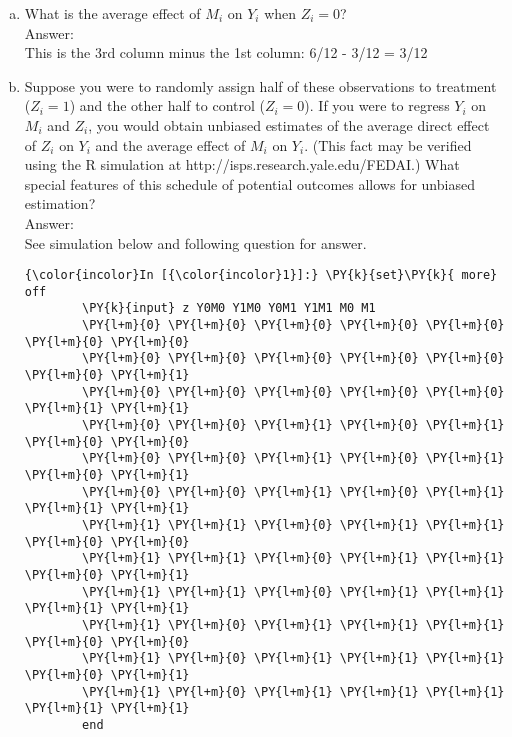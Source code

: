 \documentclass[11pt,notitlepage]{article}\usepackage[]{graphicx}\usepackage[]{color}
\makeatletter
\newenvironment{kframe}{%
 \def\at@end@of@kframe{}%
 \ifinner\ifhmode%
  \def\at@end@of@kframe{\end{minipage}}%
  \begin{minipage}{\columnwidth}%
 \fi\fi%
 \def\FrameCommand##1{\hskip\@totalleftmargin \hskip-\fboxsep
 \colorbox{shadecolor}{##1}\hskip-\fboxsep
     \hskip-\linewidth \hskip-\@totalleftmargin \hskip\columnwidth}%
 \MakeFramed {\advance\hsize-\width
   \@totalleftmargin\z@ \linewidth\hsize
   \@setminipage}}%
 {\par\unskip\endMakeFramed%
 \at@end@of@kframe}
\newenvironment{knitrout}{}{} %
\makeatother
\begin{document}
\begin{enumerate}[a)]
\item What is the average effect of $M_i$ on $Y_i$ when $Z_i = 0$?\\
Answer:\\
This is the 3rd column minus the 1st column: 6/12 - 3/12 = 3/12

\item Suppose you were to randomly assign half of these observations to treatment ($Z_i = 1$) and the other half to control ($Z_i = 0$). If you were to regress $Y_i$ on $M_i$ and $Z_i$, you would obtain unbiased estimates of the average direct effect of $Z_i$ on $Y_i$ and the average effect of $M_i$ on $Y_i$. (This fact may be verified using the R simulation at http://isps.research.yale.edu/FEDAI.) What special features of this schedule of potential outcomes allows for unbiased estimation?\\
Answer:\\
See simulation below and following question for answer.
\begin{knitrout}
\color{fgcolor}\begin{kframe}
    \begin{Verbatim}[commandchars=\\\{\}]
{\color{incolor}In [{\color{incolor}1}]:} \PY{k}{set}\PY{k}{ more} off
        \PY{k}{input} z Y0M0 Y1M0 Y0M1 Y1M1 M0 M1
        \PY{l+m}{0} \PY{l+m}{0} \PY{l+m}{0} \PY{l+m}{0} \PY{l+m}{0} \PY{l+m}{0} \PY{l+m}{0} 
        \PY{l+m}{0} \PY{l+m}{0} \PY{l+m}{0} \PY{l+m}{0} \PY{l+m}{0} \PY{l+m}{0} \PY{l+m}{1}
        \PY{l+m}{0} \PY{l+m}{0} \PY{l+m}{0} \PY{l+m}{0} \PY{l+m}{0} \PY{l+m}{1} \PY{l+m}{1}
        \PY{l+m}{0} \PY{l+m}{0} \PY{l+m}{1} \PY{l+m}{0} \PY{l+m}{1} \PY{l+m}{0} \PY{l+m}{0}
        \PY{l+m}{0} \PY{l+m}{0} \PY{l+m}{1} \PY{l+m}{0} \PY{l+m}{1} \PY{l+m}{0} \PY{l+m}{1} 
        \PY{l+m}{0} \PY{l+m}{0} \PY{l+m}{1} \PY{l+m}{0} \PY{l+m}{1} \PY{l+m}{1} \PY{l+m}{1}
        \PY{l+m}{1} \PY{l+m}{1} \PY{l+m}{0} \PY{l+m}{1} \PY{l+m}{1} \PY{l+m}{0} \PY{l+m}{0}
        \PY{l+m}{1} \PY{l+m}{1} \PY{l+m}{0} \PY{l+m}{1} \PY{l+m}{1} \PY{l+m}{0} \PY{l+m}{1}
        \PY{l+m}{1} \PY{l+m}{1} \PY{l+m}{0} \PY{l+m}{1} \PY{l+m}{1} \PY{l+m}{1} \PY{l+m}{1}
        \PY{l+m}{1} \PY{l+m}{0} \PY{l+m}{1} \PY{l+m}{1} \PY{l+m}{1} \PY{l+m}{0} \PY{l+m}{0}
        \PY{l+m}{1} \PY{l+m}{0} \PY{l+m}{1} \PY{l+m}{1} \PY{l+m}{1} \PY{l+m}{0} \PY{l+m}{1}
        \PY{l+m}{1} \PY{l+m}{0} \PY{l+m}{1} \PY{l+m}{1} \PY{l+m}{1} \PY{l+m}{1} \PY{l+m}{1}
        end
\end{Verbatim}


\end{kframe}
\end{knitrout}
\end{enumerate}
\end{document}
